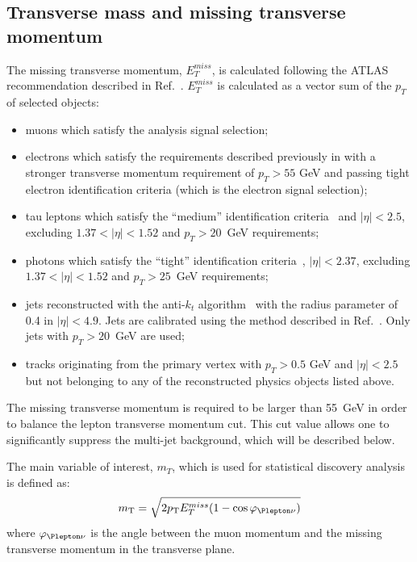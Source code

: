 \subsection{Transverse mass and missing transverse momentum}
\label{subsec:etmiss}
The missing transverse momentum, $E_T^{miss}$, is calculated following the ATLAS recommendation described in Ref.~\cite{met2015_1,met2015_2}.
$E_T^{miss}$ is calculated as a vector sum of the $p_T$ of selected objects:
\begin{itemize}
 \item muons which satisfy the analysis signal selection;
 \item electrons which satisfy the requirements described previously in
  with a stronger transverse momentum requirement of $p_T > 55$ GeV
 and passing tight electron identification criteria (which is the electron signal selection);
 \item tau leptons which satisfy the ``medium'' identification criteria~\cite{tau_id_8TeV} and $|\eta| < 2.5$, excluding  $1.37 < |\eta| < 1.52$ and $p_T > 20$~GeV requirements;
 \item photons which satisfy the ``tight'' identification criteria~\cite{photon_id_2011}, $|\eta| < 2.37$, excluding  $1.37 < |\eta| < 1.52$ and $p_T > 25$~GeV requirements;
 \item jets reconstructed with the anti-$k_t$ algorithm~\cite{jet_anti_kt} with the radius parameter of 0.4 in $|\eta| < 4.9$.
 Jets are calibrated using the method described in Ref.~\cite{jet_calib_syst_13TeV}.
 Only jets with $p_T > 20$~GeV are used;
 \item tracks originating from the primary vertex with $p_T > 0.5$ GeV and $|\eta| < 2.5$ but not belonging to any of the reconstructed physics objects listed above.
\end{itemize}
The missing transverse momentum is required to be larger than 55~GeV in order 
to balance the lepton transverse momentum cut.
This cut value allows one to significantly suppress 
the multi-jet background, which will be described below.


The main variable of interest, $m_T$, which is used for statistical discovery analysis is defined as:
\begin{equation}
 m_\mathrm{T} = \sqrt{2 p_\mathrm{T} E_T^{miss} (1-\cos\varphi_{\Plepton\nu})}
\end{equation}
where $\varphi_{\Plepton\nu}$ is the angle between the muon momentum and the missing transverse momentum in the transverse plane.

